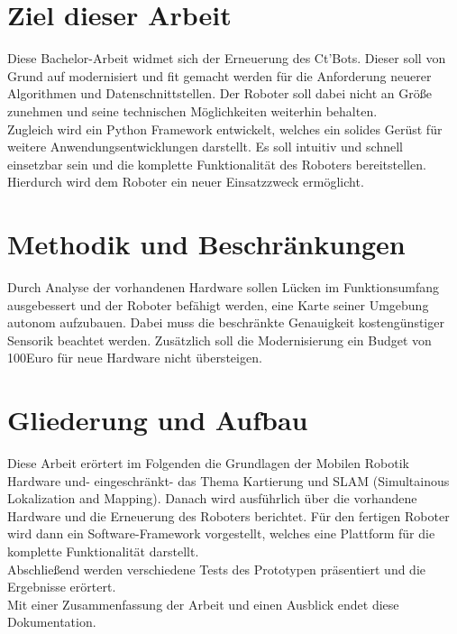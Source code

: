 \documentclass[twoside,11pt, a4paper]{report}
\begin{document}
	\section{Ziel dieser Arbeit}
	Diese Bachelor-Arbeit widmet sich der Erneuerung des Ct'Bots. Dieser soll von Grund auf modernisiert und fit gemacht werden für die Anforderung neuerer Algorithmen und Datenschnittstellen. Der Roboter soll dabei nicht an Größe zunehmen und seine technischen Möglichkeiten weiterhin behalten. \\
	
	Zugleich wird ein Python Framework entwickelt, welches ein solides Gerüst für weitere Anwendungsentwicklungen darstellt. Es soll intuitiv und schnell einsetzbar sein und die komplette Funktionalität des Roboters bereitstellen. Hierdurch wird dem Roboter ein neuer Einsatzzweck ermöglicht. \\
	
	
	\section{Methodik und Beschränkungen}
	
	Durch Analyse der vorhandenen Hardware sollen Lücken im Funktionsumfang ausgebessert und der Roboter befähigt werden, eine Karte seiner Umgebung autonom aufzubauen. 
	Dabei muss die beschränkte Genauigkeit kostengünstiger Sensorik beachtet werden. Zusätzlich soll die Modernisierung ein Budget von 100Euro für neue Hardware nicht übersteigen. 
	
	\section{Gliederung und Aufbau}
	
	Diese Arbeit erörtert im Folgenden die Grundlagen der Mobilen Robotik Hardware und- eingeschränkt- das Thema Kartierung und SLAM (Simultainous Lokalization and Mapping). Danach wird ausführlich über die vorhandene Hardware und die Erneuerung des Roboters berichtet. Für den fertigen Roboter wird dann ein Software-Framework vorgestellt, welches eine Plattform für die komplette Funktionalität darstellt. \\
	Abschließend werden verschiedene  Tests des Prototypen präsentiert und die Ergebnisse erörtert. \\
	Mit einer Zusammenfassung der Arbeit und einen Ausblick endet diese Dokumentation.  
	
	
	
	
	
\end{document}
